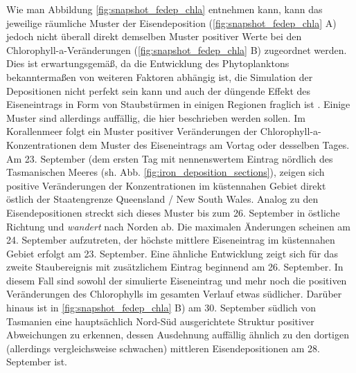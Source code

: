 \documentclass[12pt,a4paper,onecolumn]{scrartcl}
\begin{document}
Wie man Abbildung \ref{fig:snapshot_fedep_chla} entnehmen kann, kann das jeweilige räumliche Muster der Eisendeposition (\ref{fig:snapshot_fedep_chla} A) jedoch nicht überall direkt demselben Muster positiver Werte bei den Chlorophyll-a-Veränderungen (\ref{fig:snapshot_fedep_chla} B) zugeordnet werden. Dies ist erwartungsgemäß, da die Entwicklung des Phytoplanktons bekanntermaßen von weiteren Faktoren abhängig ist, die Simulation der Depositionen nicht perfekt sein kann und auch der düngende Effekt des Eiseneintrags in Form von Staubstürmen in einigen Regionen fraglich ist \citep{Boyd.2010}. Einige Muster sind allerdings auffällig, die hier beschrieben werden sollen. Im Korallenmeer folgt ein Muster positiver Veränderungen der Chlorophyll-a-Konzentrationen dem Muster des Eiseneintrags am Vortag oder desselben Tages. Am 23. September (dem ersten Tag mit nennenswertem Eintrag nördlich des Tasmanischen Meeres (sh. Abb. \ref{fig:iron_deposition_sections}), zeigen sich positive Veränderungen der Konzentrationen im küstennahen Gebiet direkt östlich der Staatengrenze Queensland / New South Wales. Analog zu den Eisendepositionen streckt sich dieses Muster bis zum 26. September in östliche Richtung und \textit{wandert} nach Norden ab. Die maximalen Änderungen scheinen am 24. September aufzutreten, der höchste mittlere Eiseneintrag im küstennahen Gebiet erfolgt am 23. September. Eine ähnliche Entwicklung zeigt sich für das  zweite Staubereignis mit zusätzlichem Eintrag beginnend am 26. September. In diesem Fall sind sowohl der simulierte Eiseneintrag und mehr noch die positiven Veränderungen des Chlorophylls im gesamten Verlauf etwas südlicher. Darüber hinaus ist in \ref{fig:snapshot_fedep_chla} B) am 30. September südlich von Tasmanien eine hauptsächlich Nord-Süd ausgerichtete Struktur positiver Abweichungen zu erkennen, dessen Ausdehnung auffällig ähnlich zu den dortigen (allerdings vergleichsweise schwachen) mittleren Eisendepositionen am 28. September ist. \\
\end{document}
